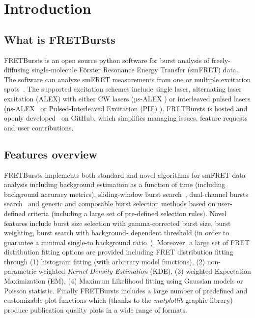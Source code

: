 \section{Introduction}

\subsection{What is FRETBursts}

FRETBursts is an open source python software for burst analysis of freely-diffusing 
single-molecule Förster Resonance Energy Transfer (smFRET) data. 
The software can analyze smFRET measurements
from one or multiple excitation spots~\cite{Ingargiola_2013}. The supported 
excitation schemes include single laser, alternating laser excitation (ALEX) 
with either CW lasers (µs-ALEX \cite{Kapanidis_2005}) 
or interleaved pulsed lasers (ns-ALEX~\cite{Laurence_2005} or 
Pulsed-Interleaved Excitation (PIE) \cite{M_ller_2005}). 
FRETBursts is hosted and openly developed~\cite{Prli__2012} on GitHub, which
simplifies managing issues, feature requests and user contributions.

\subsection{Features overview}

FRETBursts implements both standard and novel algorithms for smFRET data analysis 
including background estimation as a function of time (including background accuracy 
metrics), sliding-window burst search~\cite{Eggeling_1998}, dual-channel bursts search~\cite{Nir_2006} and
generic and composable burst selection methods based on user-defined criteria 
(including a large set of pre-defined selection rules). Novel features include burst size
selection with gamma-corrected burst size, burst weighting, burst search with background-
dependent threshold (in order to guarantee a minimal single-to background ratio~\cite{Michalet_2012}).
Moreover, a large set of FRET distribution fitting options are provided including
FRET distribution fitting through (1) histogram fitting (with arbitrary model functions), 
(2)  non-parametric weighted \textit{Kernel Density Estimation} (KDE), (3) weighted 
Expectation Maximization (EM), (4) Maximum Likelihood fitting using Gaussian models 
or Poisson statistic. Finally FRETBursts includes a large number of
predefined and customizable plot functions which (thanks to the \textit{matplotlib} 
graphic library) produce publication quality plots in a wide range of formats.

